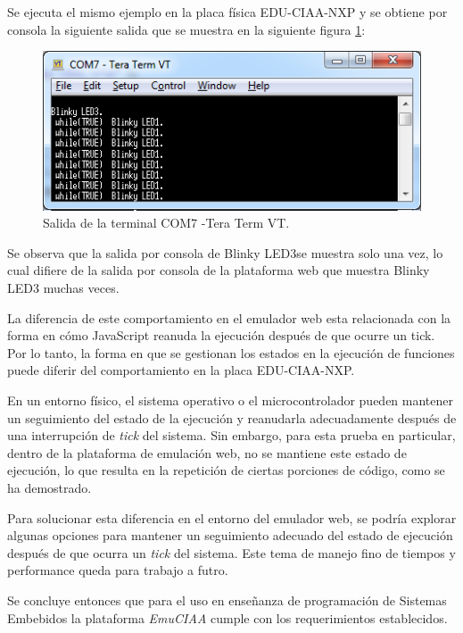 Se ejecuta el mismo ejemplo en la placa física EDU-CIAA-NXP y se obtiene por consola la siguiente salida que se muestra en la siguiente figura \ref{fig:TesttickhookPlaca}:

\begin{figure}[ht]
	\centering
	\includegraphics[scale=.80]{./Figures/TesttickhookPlaca.png}
	\caption{Salida de la terminal COM7 -Tera Term VT.}
	\label{fig:TesttickhookPlaca}
\end{figure}

Se observa que la salida por consola de \textquotedbl Blinky LED3\textquotedbl se muestra solo una vez, lo cual difiere de la salida por consola de la plataforma web que muestra \textquotedbl Blinky LED3\textquotedbl{} muchas veces.

La diferencia de este comportamiento en el emulador web esta relacionada con la forma en cómo JavaScript reanuda la ejecución después de que ocurre un tick. Por lo tanto, la forma en que se gestionan los estados en la ejecución de funciones puede diferir del comportamiento en la placa EDU-CIAA-NXP.

En un entorno físico, el sistema operativo o el microcontrolador pueden mantener un seguimiento del estado de la ejecución y reanudarla adecuadamente después de una interrupción de \textit{tick} del sistema. Sin embargo, para esta prueba en particular, dentro de la plataforma de emulación web, no se mantiene este estado de ejecución, lo que resulta en la repetición de ciertas porciones de código, como se ha demostrado.

Para solucionar esta diferencia en el entorno del emulador web, se podría explorar algunas opciones para mantener un seguimiento adecuado del estado de ejecución después de que ocurra un \textit{tick} del sistema. Este tema de manejo fino de tiempos y performance queda para trabajo a futro.

Se concluye entonces que para el uso en enseñanza de programación de Sistemas Embebidos la plataforma \textit{EmuCIAA} cumple con los requerimientos establecidos.